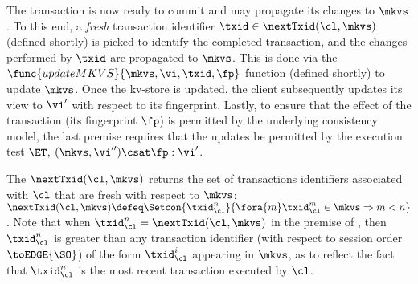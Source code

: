 The transaction is now ready to commit and may propagate its changes to $\mkvs$.
To this end, a \emph{fresh} transaction identifier $\txid \in \nextTxid(\cl, \mkvs)$ (defined shortly) is picked
to identify the completed transaction, and the changes performed by $\txid$ are propagated to $\mkvs$. 
This is done via the $\func{updateMKVS}{\mkvs, \vi, \txid, \fp}$ function (defined shortly) to update $\mkvs$. 
Once the kv-store is updated, the client subsequently updates its view to $\vi'$ with respect to its fingerprint. 
Lastly, to ensure that the effect of the transaction (its fingerprint  $\fp$) is permitted by the underlying consistency model, 
the last premise requires that the updates be permitted by the execution test $\ET$, \ie \( (\mkvs, \vi'') \csat \fp : \vi'\).

The $\nextTxid(\cl, \mkvs)$ returns the set of transactions identifiers associated with $\cl$ that are fresh with respect to $\mkvs$: 
$\nextTxid(\cl, \mkvs) \defeq \Setcon{\txid_{\cl}^{n}}{\fora{m} \txid_{\cl}^{m} \in \mkvs \Rightarrow m < n }$.
Note that when $\txid_\cl^n = \nextTxid(\cl, \mkvs)$ in the premise of , then $\txid_\cl^n$ is greater than any transaction identifier 
(with respect to session order $\toEDGE{\SO}$) 
of the form $\txid_{\cl}^{i}$ appearing in $\mkvs$,
as to reflect the fact that $\txid_\cl^n$ is the most recent transaction executed by $\cl$.

